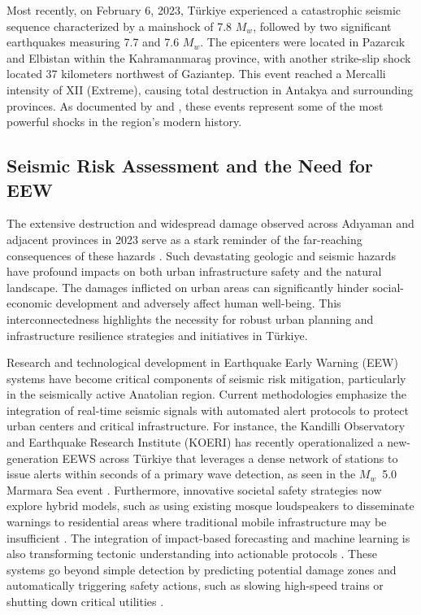 \documentclass[data,article,submit,pdftex,moreauthors]{Definitions/mdpi}
\begin{document}
Most recently, on February 6, 2023, Türkiye experienced a catastrophic seismic sequence characterized by a mainshock of 7.8 $M_w$, followed by two significant earthquakes measuring 7.7 and 7.6 $M_w$. The epicenters were located in Pazarcık and Elbistan within the Kahramanmaraş province, with another strike-slip shock located 37 kilometers northwest of Gaziantep. This event reached a Mercalli intensity of XII (Extreme), causing total destruction in Antakya and surrounding provinces. As documented by \cite{Akcan2024} and \cite{Akinci2025}, these events represent some of the most powerful shocks in the region’s modern history.

\subsection{Seismic Risk Assessment and the Need for EEW}

The extensive destruction and widespread damage observed across Adıyaman and adjacent provinces in 2023 serve as a stark reminder of the far-reaching consequences of these hazards \cite{Hussain2023,Yilmaz2025,Toprak2025,Carena2023}. Such devastating geologic and seismic hazards have profound impacts on both urban infrastructure safety and the natural landscape. The damages inflicted on urban areas can significantly hinder social-economic development and adversely affect human well-being. This interconnectedness highlights the necessity for robust urban planning and infrastructure resilience strategies and initiatives in Türkiye. 

Research and technological development in Earthquake Early Warning (EEW) systems have become critical components of seismic risk mitigation, particularly in the seismically active Anatolian region. Current methodologies emphasize the integration of real-time seismic signals with automated alert protocols to protect urban centers and critical infrastructure. For instance, the Kandilli Observatory and Earthquake Research Institute (KOERI) has recently operationalized a new-generation EEWS across T{\"u}rkiye that leverages a dense network of stations to issue alerts within seconds of a primary wave detection, as seen in the $M_w$~5.0 Marmara Sea event \cite{Ozeletal2026}. Furthermore, innovative societal safety strategies now explore hybrid models, such as using existing mosque loudspeakers to disseminate warnings to residential areas where traditional mobile infrastructure may be insufficient \cite{Eren2025}. The integration of impact-based forecasting and machine learning is also transforming tectonic understanding into actionable protocols \cite{Doganetal2019}. These systems go beyond simple detection by predicting potential damage zones and automatically triggering safety actions, such as slowing high-speed trains or shutting down critical utilities \cite{CremenGalasso2020, Specialeetal2026}.
\end{document}
